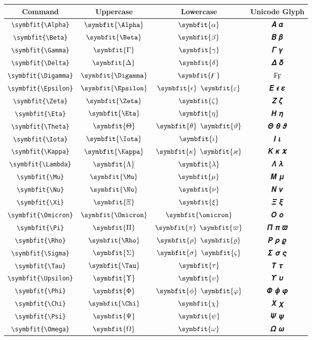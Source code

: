 \documentclass[12pt,a4paper]{article}
\begin{document}
\begin{longtable}{|c|c|c|c|}
\hline
\textbf{Command} & \textbf{Uppercase} & \textbf{Lowercase} & \textbf{Unicode Glyph} \\
\hline
\verb|\symbfit{\Alpha}| & $\symbfit{\Alpha}$ & $\symbfit{\alpha}$ & 𝜜 𝜶 \\
\verb|\symbfit{\Beta}| & $\symbfit{\Beta}$ & $\symbfit{\beta}$ & 𝜝 𝜷 \\
\verb|\symbfit{\Gamma}| & $\symbfit{\Gamma}$ & $\symbfit{\gamma}$ & 𝜞 𝜸 \\
\verb|\symbfit{\Delta}| & $\symbfit{\Delta}$ & $\symbfit{\delta}$ & 𝜟 𝜹 \\
\verb|\symbfit{\Digamma}| & $\symbfit{\Digamma}$ & $\symbfit{\digamma}$ & $ Ϝ ϝ $ \\
\verb|\symbfit{\Epsilon}| & $\symbfit{\Epsilon}$ & $\symbfit{\epsilon}$ $\symbfit{\varepsilon}$ & 𝜠 𝝐 𝜺 \\
\verb|\symbfit{\Zeta}| & $\symbfit{\Zeta}$ & $\symbfit{\zeta}$ & 𝜡 𝜻 \\
\verb|\symbfit{\Eta}| & $\symbfit{\Eta}$ & $\symbfit{\eta}$ & 𝜢 𝜼 \\
\verb|\symbfit{\Theta}| & $\symbfit{\Theta}$ & $\symbfit{\theta}$ $\symbfit{\vartheta}$ & 𝜣 𝜽 𝝑 \\
\verb|\symbfit{\Iota}| & $\symbfit{\Iota}$ & $\symbfit{\iota}$ & 𝜤 𝜾 \\
\verb|\symbfit{\Kappa}| & $\symbfit{\Kappa}$ & $\symbfit{\kappa}$ $\symbfit{\varkappa}$ & 𝜥 𝜿 𝝒 \\
\verb|\symbfit{\Lambda}| & $\symbfit{\Lambda}$ & $\symbfit{\lambda}$ & 𝜦 𝝀 \\
\verb|\symbfit{\Mu}| & $\symbfit{\Mu}$ & $\symbfit{\mu}$ & 𝜧 𝝁 \\
\verb|\symbfit{\Nu}| & $\symbfit{\Nu}$ & $\symbfit{\nu}$ & 𝜨 𝝂 \\
\verb|\symbfit{\Xi}| & $\symbfit{\Xi}$ & $\symbfit{\xi}$ & 𝜩 𝝃 \\
\verb|\symbfit{\Omicron}| & $\symbfit{\Omicron}$ & $\symbfit{\omicron}$ & 𝜪 𝝄 \\
\verb|\symbfit{\Pi}| & $\symbfit{\Pi}$ & $\symbfit{\pi}$ $\symbfit{\varpi}$ & 𝜫 𝝅 𝝕 \\
\verb|\symbfit{\Rho}| & $\symbfit{\Rho}$ & $\symbfit{\rho}$ $\symbfit{\varrho}$ & 𝜬 𝝆 𝝔 \\
\verb|\symbfit{\Sigma}| & $\symbfit{\Sigma}$ & $\symbfit{\sigma}$ $\symbfit{\varsigma}$ & 𝜮 𝝈 𝝇 \\
\verb|\symbfit{\Tau}| & $\symbfit{\Tau}$ & $\symbfit{\tau}$ & 𝜯 𝝉 \\
\verb|\symbfit{\Upsilon}| & $\symbfit{\Upsilon}$ & $\symbfit{\upsilon}$ & 𝜰 𝝊 \\
\verb|\symbfit{\Phi}| & $\symbfit{\Phi}$ & $\symbfit{\phi}$ $\symbfit{\varphi}$ & 𝜱 𝝓 𝝋 \\
\verb|\symbfit{\Chi}| & $\symbfit{\Chi}$ & $\symbfit{\chi}$ & 𝜲 𝝌 \\
\verb|\symbfit{\Psi}| & $\symbfit{\Psi}$ & $\symbfit{\psi}$ & 𝜳 𝝍 \\
\verb|\symbfit{\Omega}| & $\symbfit{\Omega}$ & $\symbfit{\omega}$ & 𝜴 𝝎 \\
\hline
\end{longtable}
\end{document}
